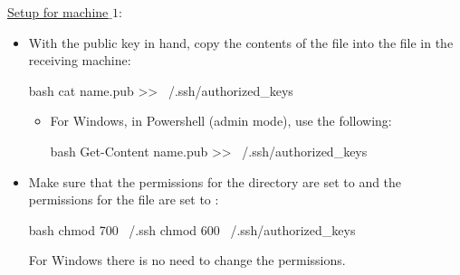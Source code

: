 \underline{\underline{Setup for machine$\_1$}}:

\begin{itemize}
    \item With the public key in hand, copy the contents of the file into the
     file in the receiving machine:
    \begin{mintedbox}{bash}
cat name.pub >> ~/.ssh/authorized_keys
    \end{mintedbox}
    \begin{itemize}
        \item For Windows, in Powershell (admin mode), use the following:
        \begin{mintedbox}{bash}
Get-Content name.pub >> ~/.ssh/authorized_keys
        \end{mintedbox}
    \end{itemize}
    \item Make sure that the permissions for the  directory are set to
     and the permissions for the  file are
    set to :
    \begin{mintedbox}{bash}
chmod 700 ~/.ssh
chmod 600 ~/.ssh/authorized_keys
    \end{mintedbox}
    For Windows there is no need to change the permissions.
\end{itemize}
